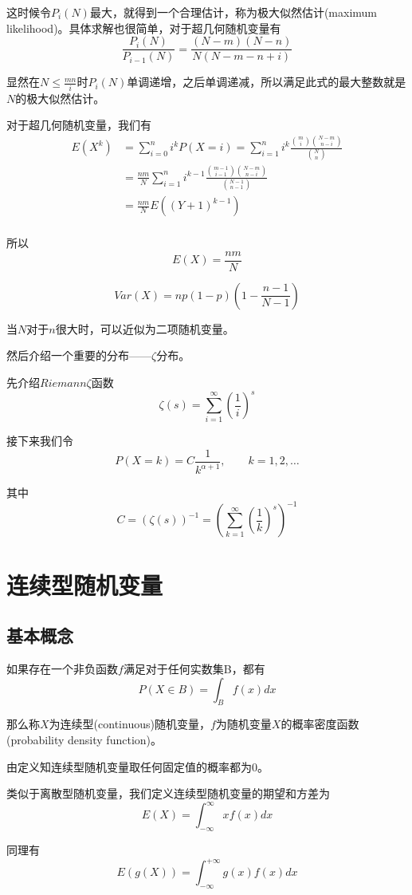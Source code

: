 \documentclass[UTF8]{ctexart}
\begin{document}
这时候令$P_{i}(N)$最大，就得到一个合理估计，称为极大似然估计(maximum likelihood)。具体求解也很简单，对于超几何随机变量有
$$\frac{P_{i}(N)}{P_{i-1}(N)}=\frac{(N-m)(N-n)}{N(N-m-n+i)}$$

显然在$N\leq \frac{mn}{i}$时$P_{i}(N)$单调递增，之后单调递减，所以满足此式的最大整数就是$N$的极大似然估计。

对于超几何随机变量，我们有
$$\begin{aligned}
E(X^{k})&=\sum_{i=0}^{n}i^{k}P(X=i)=\sum_{i=1}^{n}i^{k}\frac{\binom{m}{i} \binom{N-m}{n-i}}{\binom{N}{n}}\\
&=\frac{nm}{N}\sum_{i=1}^{n}i^{k-1}\frac{\binom{m-1}{i-1}\binom{N-m}{n-i}}{\binom{N-1}{n-1}}\\
&=\frac{nm}{N}E((Y+1)^{k-1})\\
\end{aligned}$$

所以
$$E(X)=\frac{nm}{N}$$

$$Var(X)=np(1-p)(1-\frac{n-1}{N-1})$$

当$N$对于$n$很大时，可以近似为二项随机变量。

然后介绍一个重要的分布——$\zeta $分布。

先介绍$Riemann\zeta $函数
$$\zeta (s)=\sum_{i=1}^{\infty } (\frac{1}{i})^{s}$$

接下来我们令
$$P(X=k)=C\frac{1}{k^{\alpha +1}},\qquad k=1,2,\ldots $$

其中
$$C=(\zeta (s))^{-1}=(\sum_{k=1}^{\infty } (\frac{1}{k})^{s})^{-1}$$

\newpage

\section{连续型随机变量}

\subsection{基本概念}

如果存在一个非负函数$f$满足对于任何实数集B，都有
$$P(X\in B)=\int_{B}f(x)dx $$

那么称$X$为连续型(continuous)随机变量，$f$为随机变量$X$的概率密度函数(probability density function)。

由定义知连续型随机变量取任何固定值的概率都为$0$。

类似于离散型随机变量，我们定义连续型随机变量的期望和方差为
$$E(X)=\int_{-\infty }^{\infty }xf(x)dx $$

同理有
$$E(g(X))=\int_{-\infty }^{+\infty }g(x)f(x)dx $$
\end{document}
